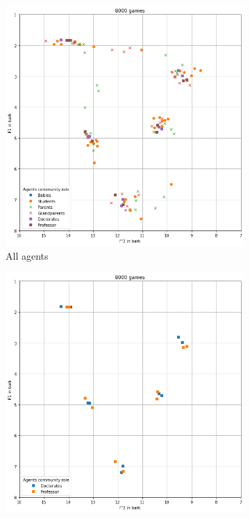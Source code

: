 \begin{figure}[ht]
    \centering
    \begin{subfigure}{.30\textwidth}
        \centering
        \includegraphics[width=\textwidth]{images/results/dual_all.png}
        \captionsetup{width=0.9\linewidth}
        \captionsetup{justification=centering}
        \caption{All agents}
    \end{subfigure}
    \hspace{0.5cm}
    \begin{subfigure}{.30\textwidth}
        \centering
        \includegraphics[width=\textwidth]{images/results/dual_high.png}

\end{subfigure}
\end{figure}
